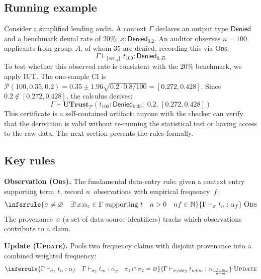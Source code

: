 \documentclass{ceurart}
\newcommand{\smark}[1]{\textsc{#1}}
\newcommand{\Denied}{\textsf{Denied}}
\newcommand{\UTrust}{\textbf{UTrust}}
\newcommand{\CI}{\mathcal{P}}
\begin{document}
\subsection{Running example}\label{sec:example}

Consider a simplified lending audit.
A context $\Gamma$ declares an output type $\Denied$ and
a benchmark denial rate of $20\%$: $x:\Denied_{0.2}$.
An auditor observes $n=100$ applicants from group~$A$, of whom $35$
are denied, recording this via \textsc{Obs}:
\[
\Gamma \vdash_{\{\mathit{src}_A\}} t_{100} : \Denied_{0.35}
\]
To test whether this observed rate is consistent with the $20\%$
benchmark, we apply \textsc{IUT}.
The one-sample CI is
$\CI(100, 0.35, 0.2) = 0.35 \pm 1.96\sqrt{0.2 \cdot 0.8 / 100}
  = [0.272, 0.428]$.
Since $0.2 \notin [0.272, 0.428]$, the calculus derives:
\[
\Gamma \vdash \UTrust_\CI(t_{100}:\Denied_{0.35};\; 0.2,\, [0.272, 0.428])
\]
This certificate is a self-contained artifact: anyone with the
checker can verify that the derivation is valid without re-running
the statistical test or having access to the raw data.
The next section presents the rules formally.


\subsection{Key rules}\label{sec:rules}

\noindent
\textbf{Observation (\textsc{Obs}).}
The fundamental data-entry rule: given a context entry supporting
term~$t$, record $n$~observations with empirical frequency~$f$:
\[
\inferrule{\sigma\neq\varnothing \quad
  \exists!\, x{:}\alpha_c\in\Gamma\text{ supporting }t \quad
  n>0 \quad nf\in\mathbb{N}}
  {\Gamma \vdash_\sigma t_n : \alpha_f}
  \;\smark{Obs}
\]
The provenance~$\sigma$ (a set of data-source identifiers) tracks
which observations contribute to a claim.

\smallskip\noindent
\textbf{Update (\textsc{Update}).}
Pools two frequency claims with disjoint provenance into a
combined weighted frequency:
\[
\inferrule{\Gamma\vdash_{\sigma_1} t_n:\alpha_f \quad
           \Gamma\vdash_{\sigma_2} t_m:\alpha_g \quad
           \sigma_1\cap\sigma_2=\varnothing}
  {\Gamma\vdash_{\sigma_1\uplus\sigma_2}
     t_{n+m}:\alpha_{\frac{nf+mg}{n+m}}}
  \;\smark{Update}
\]
\end{document}
